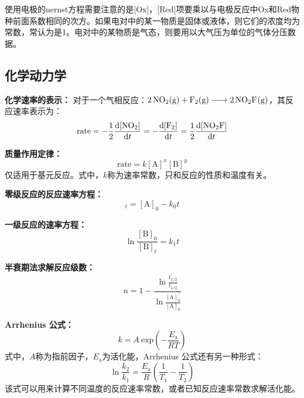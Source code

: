 \documentclass[
  10pt,
  twoside,
  openany,
  b5paper, %
  colorscheme = basic, %
  xits = false,
]{qyxf-book}
\begin{document}
使用电极的nernst方程需要注意的是[Ox]，[Red]项要乘以与电极反应中Ox和Red物种前面系数相同的次方。如果电对中的某一物质是固体或液体，则它们的浓度均为常数，常认为是1。电对中的某物质是气态，则要用以大气压为单位的气体分压数据。

\subsection{化学动力学}

\textbf{化学速率的表示：} 对于一个气相反应：$\ce{2NO2(g) + F2(g) -> 2NO2F(g)}$，其反应速率表示为：
	\begin{equation*}
		\mathrm{rate} = -\frac{1}{2} \frac{\mathrm{d}[\ce{NO2}]}{\mathrm{d}t} =  - \frac{\mathrm{d}[\ce{F2}]}{\mathrm{d}t} =  \frac{1}{2} \frac{\mathrm{d}[\ce{NO2F}]}{\mathrm{d}t}
	\end{equation*}

\textbf{质量作用定律：}
	\begin{equation*}
		\mathrm{rate} = k[\mathrm{A}]^x[\mathrm{B}]^y
	\end{equation*}
仅适用于基元反应。式中，$k$称为速率常数，只和反应的性质和温度有关。

\textbf{零级反应的反应速率方程：}
	\begin{equation*}
		[\mathrm{A}]_t = [\mathrm{A}]_0 -k_0t
	\end{equation*}

\textbf{一级反应的速率方程：}
	\begin{equation*}
		\ln \frac{[\mathrm{B}]_0}{[\mathrm{B}]_t} = k_1t
	\end{equation*}

\textbf{半衰期法求解反应级数：}
	\begin{equation*}
		n = 1-\frac{\ln \frac{t^\prime_{1/2}}{t_{1/2}}}{\ln \frac{[\mathrm{A}]^\prime_0}{[\mathrm{A}]_0}}
	\end{equation*}

\textbf{Arrhenius 公式：}
	\begin{equation*}
		k = A \ \mathrm{exp}\left(-\frac{E_\mathrm{a}}{RT}\right)
	\end{equation*}
式中，$A$称为指前因子，$E_\mathrm{a}$为活化能，Arrhenius 公式还有另一种形式：
	\begin{equation*}
		\ln \frac{k_2}{k_1} = \frac{E_\mathrm{a}}{R} \left(\frac{1}{T_1}-\frac{1}{T_2}\right)
	\end{equation*}
该式可以用来计算不同温度的反应速率常数，或者已知反应速率常数求解活化能。

\newpage
\end{document}
